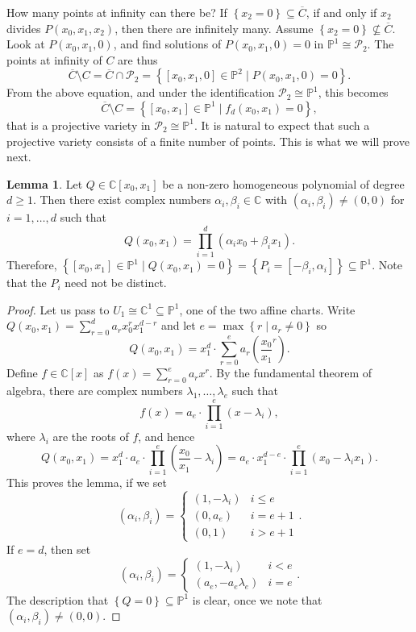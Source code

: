 \documentclass{article}
\newcommand{\C}{\mathbb{C}}
\renewcommand{\P}{\mathbb{P}}
\newcommand{\rb}[1]{\left( #1 \right)}
\renewcommand{\sb}[1]{\left[ #1 \right]}
\newcommand{\cb}[1]{\left\{ #1 \right\}}
\theoremstyle{definition}\newtheorem{definition}{Definition}[section]
\theoremstyle{definition}\newtheorem{notation}[definition]{Notation}
\theoremstyle{definition}\newtheorem{remark}[definition]{Remark}
\theoremstyle{definition}\newtheorem{example}[definition]{Example}
\theoremstyle{definition}\newtheorem{fact}{Fact}
\theoremstyle{definition}\newtheorem{exercise}{Exercise}
\newtheorem{lemma}[definition]{Lemma}
\begin{document}
How many points at infinity can there be? If $ \cb{x_2 = 0} \subseteq \overline{C} $, if and only if $ x_2 $ divides $ P\rb{x_0, x_1, x_2} $, then there are infinitely many. Assume $ \cb{x_2 = 0} \not\subseteq \overline{C} $. Look at $ P\rb{x_0, x_1, 0} $, and find solutions of $ P\rb{x_0, x_1, 0} = 0 $ in $ \P^1 \cong \mathcal{P}_2 $. The points at infinity of $ C $ are thus
$$ \overline{C} \setminus C = \overline{C} \cap \mathcal{P}_2 = \cb{\sb{x_0, x_1, 0} \in \P^2 \mid P\rb{x_0, x_1, 0} = 0}. $$
From the above equation, and under the identification $ \mathcal{P}_2 \cong \P^1 $, this becomes
$$ \overline{C} \setminus C = \cb{\sb{x_0, x_1} \in \P^1 \mid f_d\rb{x_0, x_1} = 0}, $$
that is a projective variety in $ \mathcal{P}_2 \cong \P^1 $. It is natural to expect that such a projective variety consists of a finite number of points. This is what we will prove next.

\begin{lemma}
\label{lem:6.2}
Let $ Q \in \C\sb{x_0, x_1} $ be a non-zero homogeneous polynomial of degree $ d \ge 1 $. Then there exist complex numbers $ \alpha_i, \beta_i \in \C $ with $ \rb{\alpha_i, \beta_i} \ne \rb{0, 0} $ for $ i = 1, \dots, d $ such that
$$ Q\rb{x_0, x_1} = \prod_{i = 1}^d \rb{\alpha_ix_0 + \beta_ix_1}. $$
Therefore, $ \cb{\sb{x_0, x_1} \in \P^1 \mid Q\rb{x_0, x_1} = 0} = \cb{P_i = \sb{-\beta_i, \alpha_i}} \subseteq \P^1 $. Note that the $ P_i $ need not be distinct.
\end{lemma}

\begin{proof}
Let us pass to $ U_1 \cong \C^1 \subseteq \P^1 $, one of the two affine charts. Write $ Q\rb{x_0, x_1} = \sum_{r = 0}^d a_rx_0^rx_1^{d - r} $ and let $ e = \max\cb{r \mid a_r \ne 0} $ so
$$ Q\rb{x_0, x_1} = x_1^d \cdot \sum_{r = 0}^e a_r\rb{\dfrac{x_0}{x_1}^r}. $$
Define $ f \in \C\sb{x} $ as $ f\rb{x} = \sum_{r = 0}^e a_rx^r $. By the fundamental theorem of algebra, there are complex numbers $ \lambda_1, \dots, \lambda_e $ such that
$$ f\rb{x} = a_e \cdot \prod_{i = 1}^e \rb{x - \lambda_i}, $$
where $ \lambda_i $ are the roots of $ f $, and hence
$$ Q\rb{x_0, x_1} = x_1^d \cdot a_e \cdot \prod_{i = 1}^e \rb{\dfrac{x_0}{x_1} - \lambda_i} = a_e \cdot x_1^{d - e} \cdot \prod_{i = 1}^e \rb{x_0 - \lambda_ix_1}. $$
This proves the lemma, if we set
$$ \rb{\alpha_i, \beta_i} = \begin{cases} \rb{1, -\lambda_i} & i \le e \\ \rb{0, a_e} & i = e + 1 \\ \rb{0, 1} & i > e + 1 \end{cases}. $$
If $ e = d $, then set
$$ \rb{\alpha_i, \beta_i} = \begin{cases} \rb{1, -\lambda_i} & i < e \\ \rb{a_e, -a_e\lambda_e} & i = e \end{cases}. $$
The description that $ \cb{Q = 0} \subseteq \P^1 $ is clear, once we note that $ \rb{\alpha_i, \beta_i} \ne \rb{0, 0} $.
\end{proof}
\end{document}
